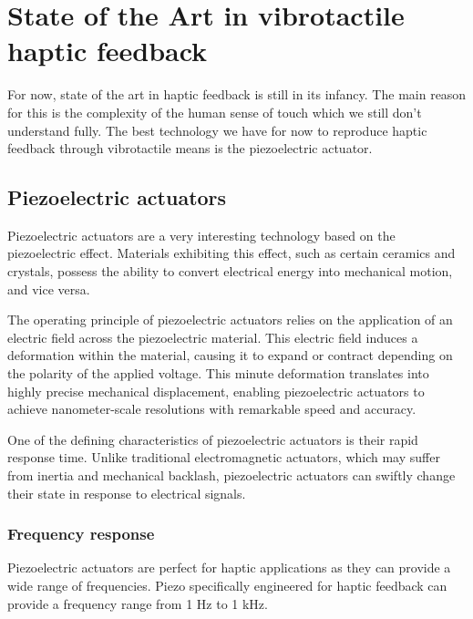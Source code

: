\section{State of the Art in vibrotactile haptic feedback}
For now, state of the art in haptic feedback is still in its infancy.
The main reason for this is the complexity of the human sense of touch which we still don't understand fully.
The best technology we have for now to reproduce haptic feedback through vibrotactile means is the piezoelectric actuator.

\subsection{Piezoelectric actuators}
Piezoelectric actuators are a very interesting technology based on the piezoelectric effect.
Materials exhibiting this effect, such as certain ceramics and crystals, possess the ability to convert electrical energy into mechanical motion, and vice versa.

The operating principle of piezoelectric actuators relies on the application of an electric field across the piezoelectric material. This electric field induces a deformation within the material, causing it to expand or contract depending on the polarity of the applied voltage. This minute deformation translates into highly precise mechanical displacement, enabling piezoelectric actuators to achieve nanometer-scale resolutions with remarkable speed and accuracy.

One of the defining characteristics of piezoelectric actuators is their rapid response time. Unlike traditional electromagnetic actuators, which may suffer from inertia and mechanical backlash, piezoelectric actuators can swiftly change their state in response to electrical signals.

\subsubsection{Frequency response}
Piezoelectric actuators are perfect for haptic applications as they can provide a wide range of frequencies.
Piezo specifically engineered for haptic feedback can provide a frequency range from 1 Hz to 1 kHz. \\

